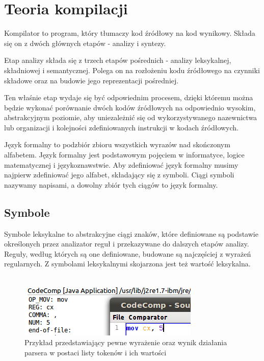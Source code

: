 \documentclass[a4paper,12pt]{article}
\begin{document}
\newpage

\section{Teoria kompilacji}

Kompilator to program, który tłumaczy kod źródłowy na kod wynikowy. Składa się on z dwóch głównych etapów - analizy i syntezy.

Etap analizy składa się z trzech etapów pośrednich - analizy leksykalnej, składniowej i semantycznej. Polega on na rozłożeniu kodu źródłowego na czynniki składowe oraz na budowie jego reprezentacji pośredniej.

Ten właśnie etap wydaje się być odpowiednim procesem, dzięki któremu można będzie wykonać porównanie dwóch kodów źródłowych na odpowiednio wysokim, abstrakcyjnym poziomie, aby uniezależnić się od wykorzystywanego nazewnictwa lub organizacji i kolejności zdefiniowanych instrukcji w kodach źródłowych.

Język formalny to podzbiór zbioru wszystkich wyrazów nad skończonym alfabetem. Język formalny jest podstawowym pojęciem w informatyce, logice matematycznej i językoznawstwie. Aby zdefiniować język formalny musimy najpierw zdefiniować jego alfabet, składający się z symboli. Ciągi symboli nazywamy napisami, a dowolny zbiór tych ciągów to język formalny.

\subsection{Symbole}

Symbole leksykalne to abstrakcyjne ciągi znaków, które definiowane są podstawie określonych przez analizator reguł i przekazywane do dalszych etapów analizy. Reguły, według których są one definiowane, budowane są najczęściej z wyrażeń regularnych. Z symbolami leksykalnymi skojarzona jest też wartość leksykalna.
\\ \\
\begin{figure}[h!]
\centering
\includegraphics[scale=0.8]{gfx/tokens.png}
\caption{Przykład przedstawiający pewne wyrażenie oraz wynik działania parsera w postaci listy tokenów i ich wartości}
\end{figure}
\end{document}
